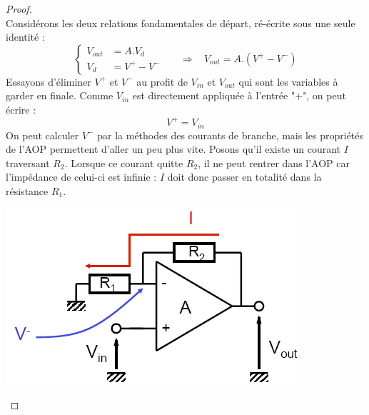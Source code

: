 \documentclass	[11pt, a4paper, openany]{book}
\begin{document}
\begin{proof}
\ \\
Considérons les deux relations fondamentales de départ, ré-écrite sous une seule identité :
\begin{equation}
\left\{\begin{array}{ll}
V_{out} & = A.V_d\\
V_d & = V^+ - V^-
\end{array}\right.\ \ \ \ \ \ \ \Rightarrow\ \ \ \ V_{out} = A.(V^+ - V^-)
\end{equation}
Essayons d'éliminer $V^+$ et $V^-$ au profit de $V_{in}$ et $V_{out}$ qui sont les variables à garder en finale. Comme $V_{in}$ est directement appliquée à l'entrée "+", on peut écrire :
\begin{equation}
V^+ = V_{in}
\end{equation}
On peut calculer $V^-$ par la méthodes des courants de branche, mais les propriétés de l'AOP permettent d'aller un peu plus vite. Posons qu'il existe un courant $I$ traversant $R_2$. Lorsque ce courant quitte $R_2$, il ne peut rentrer dans l'AOP car l'impédance de celui-ci est infinie : $I$ doit donc passer en totalité dans la résistance $R_1$.

\begin{center}
\includegraphics[scale=0.45]{img/image46}
\end{center}


\end{proof}
\end{document}
